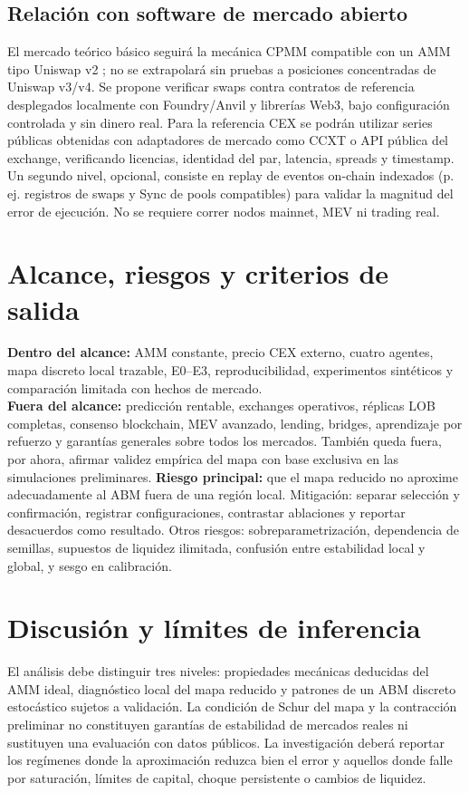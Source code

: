 \documentclass[11pt,a4paper]{article}
\begin{document}
\subsection{Relación con software de mercado abierto}
El mercado teórico básico seguirá la mecánica CPMM compatible con un AMM tipo Uniswap v2 \cite{uniswap2020,angeris2020}; no se extrapolará sin pruebas a posiciones concentradas de Uniswap v3/v4. Se propone verificar swaps contra contratos de referencia desplegados localmente con Foundry/Anvil y librerías Web3, bajo configuración controlada y sin dinero real. Para la referencia CEX se podrán utilizar series públicas obtenidas con adaptadores de mercado como CCXT o API pública del exchange, verificando licencias, identidad del par, latencia, spreads y timestamp. Un segundo nivel, opcional, consiste en replay de eventos on-chain indexados (p. ej. registros de swaps y Sync de pools compatibles) para validar la magnitud del error de ejecución. No se requiere correr nodos mainnet, MEV ni trading real.
\section{Alcance, riesgos y criterios de salida}
\textbf{Dentro del alcance:} AMM constante, precio CEX externo, cuatro agentes, mapa discreto local trazable, E0--E3, reproducibilidad, experimentos sintéticos y comparación limitada con hechos de mercado.\\
\textbf{Fuera del alcance:} predicción rentable, exchanges operativos, réplicas LOB completas, consenso blockchain, MEV avanzado, lending, bridges, aprendizaje por refuerzo y garantías generales sobre todos los mercados. También queda fuera, por ahora, afirmar validez empírica del mapa con base exclusiva en las simulaciones preliminares.
\textbf{Riesgo principal:} que el mapa reducido no aproxime adecuadamente al ABM fuera de una región local. Mitigación: separar selección y confirmación, registrar configuraciones, contrastar ablaciones y reportar desacuerdos como resultado. Otros riesgos: sobreparametrización, dependencia de semillas, supuestos de liquidez ilimitada, confusión entre estabilidad local y global, y sesgo en calibración.
\section{Discusión y límites de inferencia}
El análisis debe distinguir tres niveles: propiedades mecánicas deducidas del AMM ideal, diagnóstico local del mapa reducido y patrones de un ABM discreto estocástico sujetos a validación. La condición de Schur del mapa y la contracción preliminar no constituyen garantías de estabilidad de mercados reales ni sustituyen una evaluación con datos públicos. La investigación deberá reportar los regímenes donde la aproximación reduzca bien el error y aquellos donde falle por saturación, límites de capital, choque persistente o cambios de liquidez.
\end{document}
